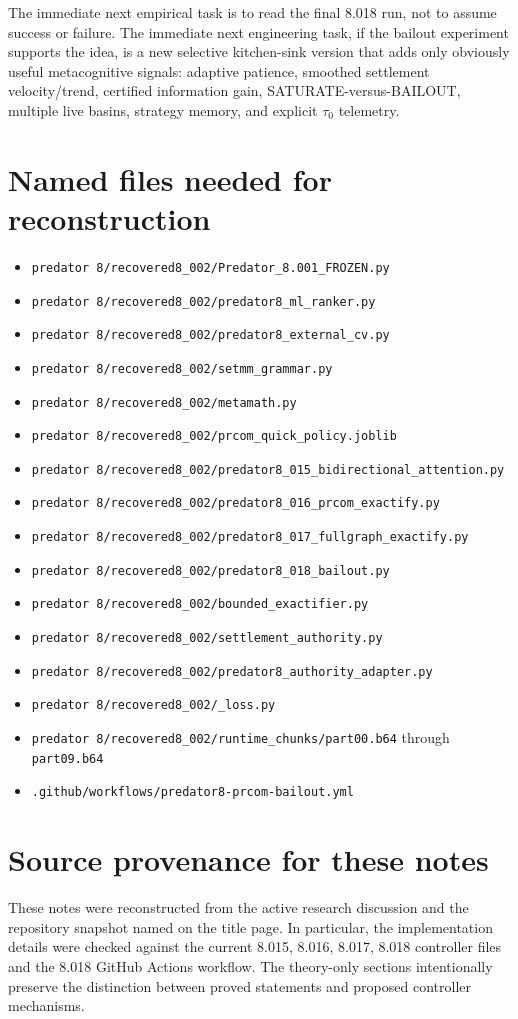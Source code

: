 \documentclass[11pt]{article}
\newcommand{\code}[1]{\texttt{#1}}
\begin{document}
The immediate next empirical task is to read the final 8.018 run, not to assume success or failure. The immediate next engineering task, if the bailout experiment supports the idea, is a new selective kitchen-sink version that adds only obviously useful metacognitive signals: adaptive patience, smoothed settlement velocity/trend, certified information gain, SATURATE-versus-BAILOUT, multiple live basins, strategy memory, and explicit $\tau_0$ telemetry.

\appendix
\section{Named files needed for reconstruction}

\begin{itemize}
\item \code{predator 8/recovered8\_002/Predator\_8.001\_FROZEN.py}
\item \code{predator 8/recovered8\_002/predator8\_ml\_ranker.py}
\item \code{predator 8/recovered8\_002/predator8\_external\_cv.py}
\item \code{predator 8/recovered8\_002/setmm\_grammar.py}
\item \code{predator 8/recovered8\_002/metamath.py}
\item \code{predator 8/recovered8\_002/prcom\_quick\_policy.joblib}
\item \code{predator 8/recovered8\_002/predator8\_015\_bidirectional\_attention.py}
\item \code{predator 8/recovered8\_002/predator8\_016\_prcom\_exactify.py}
\item \code{predator 8/recovered8\_002/predator8\_017\_fullgraph\_exactify.py}
\item \code{predator 8/recovered8\_002/predator8\_018\_bailout.py}
\item \code{predator 8/recovered8\_002/bounded\_exactifier.py}
\item \code{predator 8/recovered8\_002/settlement\_authority.py}
\item \code{predator 8/recovered8\_002/predator8\_authority\_adapter.py}
\item \code{predator 8/recovered8\_002/\_loss.py}
\item \code{predator 8/recovered8\_002/runtime\_chunks/part00.b64} through \code{part09.b64}
\item \code{.github/workflows/predator8-prcom-bailout.yml}
\end{itemize}

\section{Source provenance for these notes}

These notes were reconstructed from the active research discussion and the repository snapshot named on the title page. In particular, the implementation details were checked against the current 8.015, 8.016, 8.017, 8.018 controller files and the 8.018 GitHub Actions workflow. The theory-only sections intentionally preserve the distinction between proved statements and proposed controller mechanisms.
\end{document}
